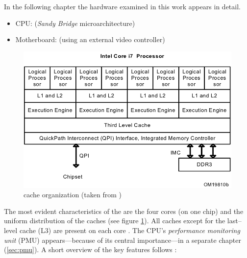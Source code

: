 \label{sec:technical-prerequisites}

In the following chapter the hardware examined in this work appears in detail.


\label{sec:hw-products}

\begin{itemize}

\item CPU: \JWPLcpu{} (\emph{San\-dy Bridge} microarchitecture)

\item Motherboard: \JWPLboard{} (using an external video controller)

\end{itemize}


\label{sec:sandy-bridge}

\begin{figure}
  \centering
    \includegraphics[width=\textwidth]{fig/intel-cache-orga.png}
  \caption{\JWPcpu{} cache organization (taken from \cite{intel2011softdev1})}
  \label{fig:cache-orga}
\end{figure}

The most evident characteristics of the \JWPcpu{} are the four cores (on one
chip) and the uniform distribution of the caches (see figure
\ref{fig:cache-orga}). All caches except for the last--level cache (L3) are
present on each core \cite{fog11}. The CPU's \emph{performance monitoring unit}
(PMU) appears---because of its central importance---in a separate chapter
(\ref{sec:pmu}). A short overview of the key features follows
\cite{intel2011spec}:

